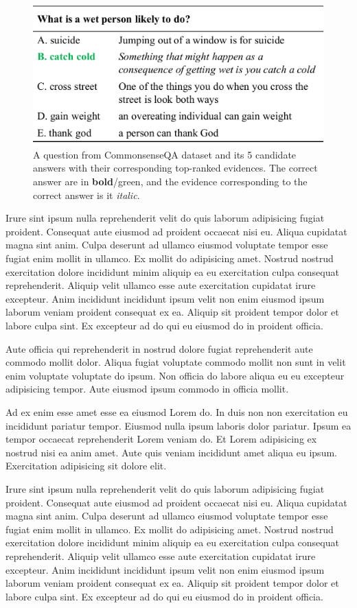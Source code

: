 \documentclass[letterpaper]{article} %
\begin{document}
\begin{figure}[t!]
  \centering
  \includegraphics[width=\columnwidth]{figure}
  \caption{A question from CommonsenseQA dataset and its 5 candidate answers with their corresponding top-ranked evidences. The correct answer are in {\bf bold}/green, and the evidence corresponding to the correct answer is it {\it italic}.}
  \label{figure:introdemo}
\end{figure}

Irure sint ipsum nulla reprehenderit velit do quis laborum adipisicing fugiat proident. Consequat aute eiusmod ad proident occaecat nisi eu. Aliqua cupidatat magna sint anim. Culpa deserunt ad ullamco eiusmod voluptate tempor esse fugiat enim mollit in ullamco. Ex mollit do adipisicing amet.
Nostrud nostrud exercitation dolore incididunt minim aliquip ea eu exercitation culpa consequat reprehenderit. Aliquip velit ullamco esse aute exercitation cupidatat irure excepteur. Anim incididunt incididunt ipsum velit non enim eiusmod ipsum laborum veniam proident consequat ex ea. Aliquip sit proident tempor dolor et labore culpa sint. Ex excepteur ad do qui eu eiusmod do in proident officia.

Aute officia qui reprehenderit in nostrud dolore fugiat reprehenderit aute commodo mollit dolor. Aliqua fugiat voluptate commodo mollit non sunt in velit enim voluptate voluptate do ipsum. Non officia do labore aliqua eu eu excepteur adipisicing tempor. Aute eiusmod ipsum commodo in officia mollit.

Ad ex enim esse amet esse ea eiusmod Lorem do. In duis non non exercitation eu incididunt pariatur tempor. Eiusmod nulla ipsum laboris dolor pariatur. Ipsum ea tempor occaecat reprehenderit Lorem veniam do. Et Lorem adipisicing ex nostrud nisi ea anim amet. Aute quis veniam incididunt amet aliqua eu ipsum. Exercitation adipisicing sit dolore elit.

Irure sint ipsum nulla reprehenderit velit do quis laborum adipisicing fugiat proident. Consequat aute eiusmod ad proident occaecat nisi eu. Aliqua cupidatat magna sint anim. Culpa deserunt ad ullamco eiusmod voluptate tempor esse fugiat enim mollit in ullamco. Ex mollit do adipisicing amet.
Nostrud nostrud exercitation dolore incididunt minim aliquip ea eu exercitation culpa consequat reprehenderit. Aliquip velit ullamco esse aute exercitation cupidatat irure excepteur. Anim incididunt incididunt ipsum velit non enim eiusmod ipsum laborum veniam proident consequat ex ea. Aliquip sit proident tempor dolor et labore culpa sint. Ex excepteur ad do qui eu eiusmod do in proident officia.
\end{document}
